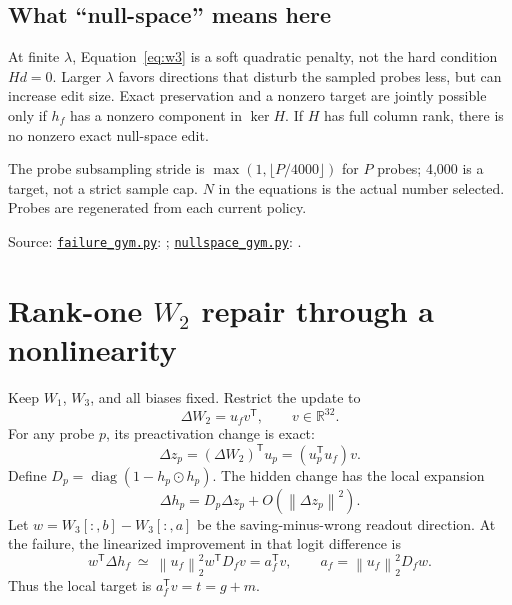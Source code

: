 \documentclass[11pt]{article}
\newcommand{\R}{\mathbb{R}}
\newcommand{\norm}[1]{\left\lVert#1\right\rVert}
\newcommand{\diag}{\operatorname{diag}}
\newcommand{\code}[1]{\texttt{\detokenize{#1}}}
\newcommand{\source}[2]{\href{https://github.com/HarleyCoops/KimiBrainSurgery/blob/13cfaec9f484a1a8864349a814bfd62905022a05/#1}{\nolinkurl{#1}}: #2}
\begin{document}
\subsection*{What ``null-space'' means here}
At finite $\lambda$, Equation~\eqref{eq:w3} is a soft quadratic penalty,
not the hard condition $Hd=0$. Larger $\lambda$ favors directions that disturb
the sampled probes less, but can increase edit size. Exact preservation and a
nonzero target are jointly possible only if $h_f$ has a nonzero component in
$\ker H$. If $H$ has full column rank, there is no nonzero exact null-space edit.

The probe subsampling stride is $\max(1,\lfloor P/4000\rfloor)$ for $P$ probes;
4,000 is a target, not a strict sample cap. $N$ in the equations is the actual
number selected. Probes are regenerated from each current policy.

\small Source: \source{failure_gym.py}{\code{solve}};
\source{nullspace_gym.py}{\code{solve_constrained}}.

\clearpage
\normalsize
\section{Rank-one \texorpdfstring{$W_2$}{W2} repair through a nonlinearity}
Keep $W_1$, $W_3$, and all biases fixed. Restrict the update to
\begin{equation}
 \Delta W_2=u_fv^{\mathsf T},\qquad v\in\R^{32}.
\end{equation}
For any probe $p$, its preactivation change is exact:
\begin{equation}
 \Delta z_p=(\Delta W_2)^{\mathsf T}u_p=(u_p^{\mathsf T}u_f)v.
\end{equation}
Define $D_p=\diag(1-h_p\odot h_p)$. The hidden change has the local expansion
\begin{equation}
 \Delta h_p=D_p\Delta z_p+O(\norm{\Delta z_p}^2).
 \label{eq:tanh}
\end{equation}
Let $w=W_3[:,b]-W_3[:,a]$ be the saving-minus-wrong readout direction.
At the failure, the linearized improvement in that logit difference is
\begin{equation}
 w^{\mathsf T}\Delta h_f\ \simeq\
 \norm{u_f}_2^2 w^{\mathsf T}D_fv=a_f^{\mathsf T}v,
 \qquad a_f=\norm{u_f}_2^2D_fw.
\end{equation}
Thus the local target is $a_f^{\mathsf T}v=t=g+m$.
\end{document}
